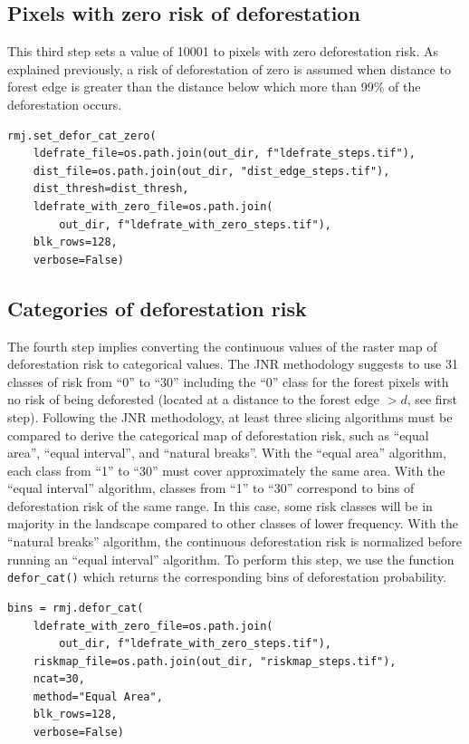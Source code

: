 \documentclass[paper=a4, 12pt, DIV=12]{scrartcl}
\begin{document}
\subsection{Pixels with zero risk of deforestation}
\label{sec:org2053a67}

This third step sets a value of 10001 to pixels with zero deforestation risk. As explained previously, a risk of deforestation of zero is assumed when distance to forest edge is greater than the distance below which more than 99\% of the deforestation occurs.

\begin{verbatim}
rmj.set_defor_cat_zero(
    ldefrate_file=os.path.join(out_dir, f"ldefrate_steps.tif"),
    dist_file=os.path.join(out_dir, "dist_edge_steps.tif"),
    dist_thresh=dist_thresh,
    ldefrate_with_zero_file=os.path.join(
        out_dir, f"ldefrate_with_zero_steps.tif"),
    blk_rows=128,
    verbose=False)
\end{verbatim}

\subsection{Categories of deforestation risk}
\label{sec:orga862ddf}

The fourth step implies converting the continuous values of the raster map of deforestation risk to categorical values. The JNR methodology suggests to use 31 classes of risk from ``0'' to ``30'' including the ``0'' class for the forest pixels with no risk of being deforested (located at a distance to the forest edge \(> d\), see first step). Following the JNR methodology, at least three slicing algorithms must be compared to derive the categorical map of deforestation risk, such as ``equal area'', ``equal interval'', and ``natural breaks''. With the ``equal area'' algorithm, each class from ``1'' to ``30'' must cover approximately the same area. With the ``equal interval'' algorithm, classes from ``1'' to ``30'' correspond to bins of deforestation risk of the same range. In this case, some risk classes will be in majority in the landscape compared to other classes of lower frequency. With the ``natural breaks'' algorithm, the continuous deforestation risk is normalized before running an ``equal interval'' algorithm. To perform this step, we use the function \texttt{defor\_cat()} which returns the corresponding bins of deforestation probability.

\begin{verbatim}
bins = rmj.defor_cat(
    ldefrate_with_zero_file=os.path.join(
        out_dir, f"ldefrate_with_zero_steps.tif"),
    riskmap_file=os.path.join(out_dir, "riskmap_steps.tif"),
    ncat=30,
    method="Equal Area",
    blk_rows=128,
    verbose=False)
\end{verbatim}
\end{document}
